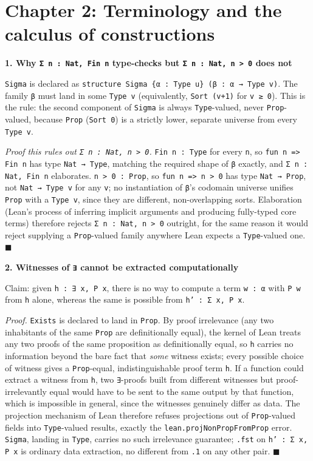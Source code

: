 \section{Chapter 2: Terminology and the calculus of constructions}\label{sec:15-appendix-solutions:02-chapter-2:1}

\textbf{1. Why \texttt{Σ n : Nat, Fin n} type-checks but \texttt{Σ n : Nat, n > 0} does not}

\texttt{Sigma} is declared as \texttt{structure Sigma \{α : Type u\} (β : α → Type v)}. The family \texttt{β} must land in some \texttt{Type v} (equivalently, \texttt{Sort (v+1)} for \texttt{v ≥ 0}). This is the rule: the second component of \texttt{Sigma} is always \texttt{Type}-valued, never \texttt{Prop}-valued, because \texttt{Prop} (\texttt{Sort 0}) is a strictly lower, separate universe from every \texttt{Type v}.

\emph{Proof this rules out \texttt{Σ n : Nat, n > 0}.} \texttt{Fin n : Type} for every \texttt{n}, so \texttt{fun n => Fin n} has type \texttt{Nat → Type}, matching the required shape of \texttt{β} exactly, and \texttt{Σ n : Nat, Fin n} elaborates. \texttt{n > 0 : Prop}, so \texttt{fun n => n > 0} has type \texttt{Nat → Prop}, not \texttt{Nat → Type v} for any \texttt{v}; no instantiation of \texttt{β}'s codomain universe unifies \texttt{Prop} with a \texttt{Type v}, since they are different, non-overlapping sorts. Elaboration (Lean's process of inferring implicit arguments and producing fully-typed core terms) therefore rejects \texttt{Σ n : Nat, n > 0} outright, for the same reason it would reject supplying a \texttt{Prop}-valued family anywhere Lean expects a \texttt{Type}-valued one. \(\blacksquare\)

\textbf{2. Witnesses of \texttt{∃} cannot be extracted computationally}

Claim: given \texttt{h : ∃ x, P x}, there is no way to compute a term \texttt{w : α} with \texttt{P w} from \texttt{h} alone, whereas the same is possible from \texttt{h' : Σ x, P x}.

\emph{Proof.} \texttt{Exists} is declared to land in \texttt{Prop}. By proof irrelevance (any two inhabitants of the same \texttt{Prop} are definitionally equal), the kernel of Lean treats any two proofs of the same proposition as definitionally equal, so \texttt{h} carries no information beyond the bare fact that \emph{some} witness exists; every possible choice of witness gives a \texttt{Prop}-equal, indistinguishable proof term \texttt{h}. If a function could extract a witness from \texttt{h}, two \texttt{∃}-proofs built from different witnesses but proof-irrelevantly equal would have to be sent to the same output by that function, which is impossible in general, since the witnesses genuinely differ as data. The projection mechanism of Lean therefore refuses projections out of \texttt{Prop}-valued fields into \texttt{Type}-valued results, exactly the \texttt{lean.projNonPropFromProp} error. \texttt{Sigma}, landing in \texttt{Type}, carries no such irrelevance guarantee; \texttt{.fst} on \texttt{h' : Σ x, P x} is ordinary data extraction, no different from \texttt{.1} on any other pair. \(\blacksquare\)

